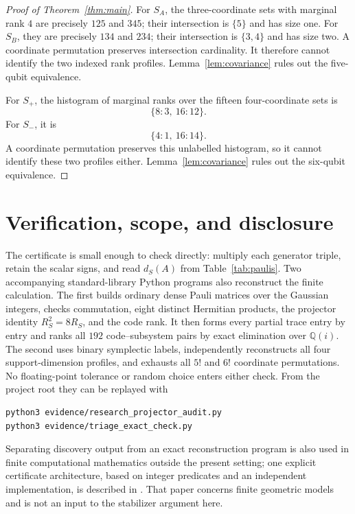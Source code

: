 \documentclass[11pt]{article}
\begin{document}
\begin{proof}[Proof of Theorem~\ref{thm:main}]
For $S_A$, the three-coordinate sets with marginal rank $4$ are precisely
$125$ and $345$; their intersection is $\{5\}$ and has size one.  For
$S_B$, they are precisely $134$ and $234$; their intersection is
$\{3,4\}$ and has size two.  A coordinate permutation preserves
intersection cardinality.  It therefore cannot identify the two indexed
rank profiles.  Lemma~\ref{lem:covariance} rules out the five-qubit
equivalence.

For $S_+$, the histogram of marginal ranks over the fifteen four-coordinate
sets is
\[
 \{8:3,\ 16:12\}.
\]
For $S_-$, it is
\[
 \{4:1,\ 16:14\}.
\]
A coordinate permutation preserves this unlabelled histogram, so it cannot
identify these two profiles either.  Lemma~\ref{lem:covariance} rules out
the six-qubit equivalence.
\end{proof}

\section{Verification, scope, and disclosure}

The certificate is small enough to check directly: multiply each generator
triple, retain the scalar signs, and read $d_S(A)$ from
Table~\ref{tab:paulis}.  Two accompanying standard-library Python programs
also reconstruct the finite calculation.  The first builds ordinary dense
Pauli matrices over the Gaussian integers, checks commutation, eight
distinct Hermitian products, the projector identity $R_S^2=8R_S$, and the
code rank.  It then forms every partial trace entry by entry and ranks all
$192$ code--subsystem pairs by exact elimination over $\mathbb Q(i)$.  The
second uses binary symplectic labels, independently reconstructs all four
support-dimension profiles, and exhausts all $5!$ and $6!$ coordinate
permutations.  No floating-point tolerance or random choice enters either
check.  From the project root they can be replayed with
\begin{verbatim}
python3 evidence/research_projector_audit.py
python3 evidence/triage_exact_check.py
\end{verbatim}

Separating discovery output from an exact reconstruction program is also
used in finite computational mathematics outside the present setting; one
explicit certificate architecture, based on integer predicates and an
independent implementation, is described in
\cite[Sec.~6]{ZengEtAl2026ExactFinite}.  That paper concerns finite
geometric models and is not an input to the stabilizer argument here.
\end{document}
